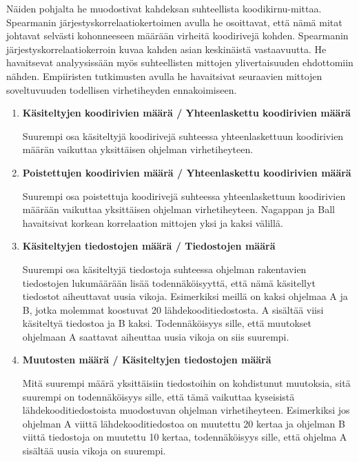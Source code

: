 \documentclass[finnish]{../tktltiki2}
\theoremstyle{definition}
\theoremstyle{remark}
\begin{document}
Näiden pohjalta he muodostivat kahdeksan suhteellista koodikirnu-mittaa. Spearmanin järjestyskorrelaatiokertoimen avulla he osoittavat, että nämä mitat johtavat selvästi kohonneeseen määrään virheitä koodirivejä kohden. Spearmanin järjestyskorrelaatiokerroin kuvaa kahden asian keskinäistä vastaavuutta. He havaitsevat analyysissään myös suhteellisten mittojen ylivertaisuuden ehdottomiin nähden. Empiiristen tutkimusten avulla he havaitsivat seuraavien mittojen soveltuvuuden todellisen virhetiheyden ennakoimiseen.

\begin{enumerate}
    
    \item {\bf Käsiteltyjen koodirivien määrä / Yhteenlaskettu koodirivien määrä}
    
    Suurempi osa käsiteltyjä koodirivejä suhteessa yhteenlaskettuun koodirivien määrän vaikuttaa yksittäisen ohjelman virhetiheyteen.
    
    \item {\bf Poistettujen koodirivien määrä / Yhteenlaskettu koodirivien määrä}
    
    Suurempi osa poistettuja koodirivejä suhteessa yhteenlaskettuun koodirivien määrään vaikuttaa yksittäisen ohjelman virhetiheyteen. Nagappan ja Ball havaitsivat korkean korrelaation mittojen yksi ja kaksi välillä.
    
    \item {\bf Käsiteltyjen tiedostojen määrä / Tiedostojen määrä}
    
    Suurempi osa käsiteltyjä tiedostoja suhteessa ohjelman rakentavien tiedostojen lukumäärään lisää todennäköisyyttä, että nämä käsitellyt tiedostot aiheuttavat uusia vikoja. Esimerkiksi meillä on kaksi ohjelmaa A ja B, jotka molemmat koostuvat 20 lähdekooditiedostosta. A sisältää viisi käsiteltyä tiedostoa ja B kaksi. Todennäköisyys sille, että muutokset ohjelmaan A saattavat aiheuttaa uusia vikoja on siis suurempi.
    
    \item {\bf Muutosten määrä / Käsiteltyjen tiedostojen määrä}
    
    Mitä suurempi määrä yksittäisiin tiedostoihin on kohdistunut muutoksia, sitä suurempi on todennäköisyys sille, että tämä vaikuttaa kyseisistä lähdekooditiedostoista muodostuvan ohjelman virhetiheyteen. Esimerkiksi jos ohjelman A viittä lähdekooditiedostoa on muutettu 20 kertaa ja ohjelman B viittä tiedostoja on muutettu 10 kertaa, todennäköisyys sille, että ohjelma A sisältää uusia vikoja on suurempi.


\end{enumerate}
\end{document}
